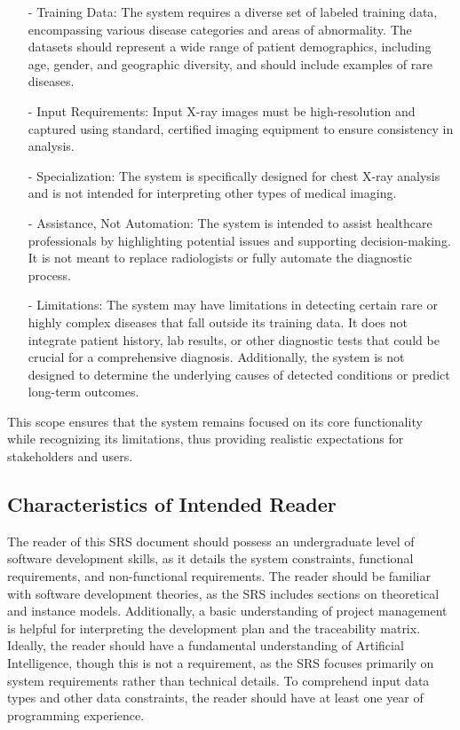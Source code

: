 \documentclass[12pt]{article}
\begin{document}
\begin{itemize}
    \item[-] Training Data: The system requires a diverse set of labeled training data, encompassing various disease categories and areas of abnormality. The datasets should represent a wide range of patient demographics, including age, gender, and geographic diversity, and should include examples of rare diseases.
    \item[-] Input Requirements: Input X-ray images must be high-resolution and captured using standard, certified imaging equipment to ensure consistency in analysis.
    \item[-] Specialization: The system is specifically designed for chest X-ray analysis and is not intended for interpreting other types of medical imaging.
    \item[-] Assistance, Not Automation: The system is intended to assist healthcare professionals by highlighting potential issues and supporting decision-making. It is not meant to replace radiologists or fully automate the diagnostic process.
    \item[-] Limitations: The system may have limitations in detecting certain rare or highly complex diseases that fall outside its training data. It does not integrate patient history, lab results, or other diagnostic tests that could be crucial for a comprehensive diagnosis. Additionally, the system is not designed to determine the underlying causes of detected conditions or predict long-term outcomes.
\end{itemize}

\noindent This scope ensures that the system remains focused on its core functionality while recognizing its limitations, thus providing realistic expectations for stakeholders and users.

\subsection{Characteristics of Intended Reader} \label{sec_IntendedReader}

The reader of this SRS document should possess an undergraduate level of software development skills, as it details the system constraints, functional requirements, and non-functional requirements. The reader should be familiar with software development theories, as the SRS includes sections on theoretical and instance models. Additionally, a basic understanding of project management is helpful for interpreting the development plan and the traceability matrix. Ideally, the reader should have a fundamental understanding of Artificial Intelligence, though this is not a requirement, as the SRS focuses primarily on system requirements rather than technical details. To comprehend input data types and other data constraints, the reader should have at least one year of programming experience.\\
\newpage
\end{document}
